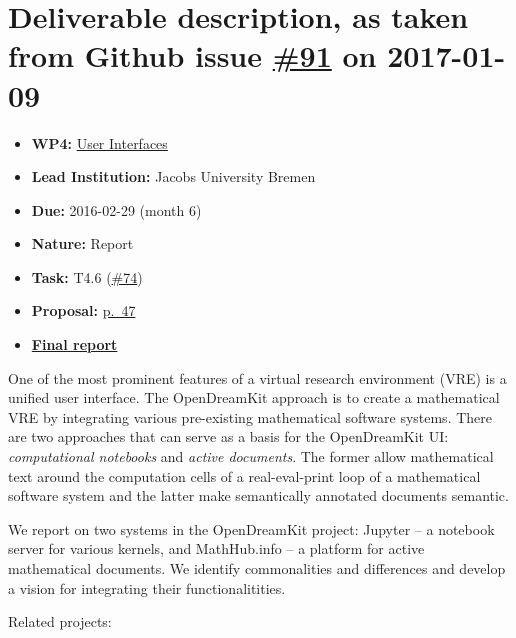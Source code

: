 \section*{\texorpdfstring{Deliverable description, as taken from Github
issue
\href{https://github.com/OpenDreamKit/OpenDreamKit/issues/91}{\#91} on
2017-01-09}{Deliverable description, as taken from Github issue \#91 on 2017-01-09}}\label{deliverable-description-as-taken-from-github-issue-91-on-2017-01-09}

\begin{itemize}
\tightlist
\item
  \textbf{WP4:}
  \href{https://github.com/OpenDreamKit/OpenDreamKit/tree/master/WP4}{User
  Interfaces}
\item
  \textbf{Lead Institution:} Jacobs University Bremen
\item
  \textbf{Due:} 2016-02-29 (month 6)
\item
  \textbf{Nature:} Report
\item
  \textbf{Task:} T4.6
  (\href{https://github.com/OpenDreamKit/OpenDreamKit/issues/74}{\#74})
\item
  \textbf{Proposal:}
  \href{https://github.com/OpenDreamKit/OpenDreamKit/raw/master/Proposal/proposal-www.pdf}{p.~47}
\item
  \textbf{\href{https://github.com/OpenDreamKit/OpenDreamKit/raw/master/WP4/D4.2/report-final.pdf}{Final
  report}}
\end{itemize}

One of the most prominent features of a virtual research environment
(VRE) is a unified user interface. The OpenDreamKit approach is to
create a mathematical VRE by integrating various pre-existing
mathematical software systems. There are two approaches that can serve
as a basis for the OpenDreamKit UI: \emph{computational notebooks} and
\emph{active documents}. The former allow mathematical text around the
computation cells of a real-eval-print loop of a mathematical software
system and the latter make semantically annotated documents semantic.

We report on two systems in the OpenDreamKit project: Jupyter -- a
notebook server for various kernels, and MathHub.info -- a platform for
active mathematical documents. We identify commonalities and differences
and develop a vision for integrating their functionalitities.

Related projects:

